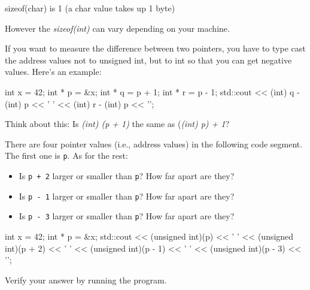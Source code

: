sizeof(char) is 1 (a char value takes up 1 byte)

However the \textit{sizeof(int)} can vary depending on your machine.

If you want to measure the difference between two pointers, you have to
type cast the address values not to unsigned int, but to int so that you
can get negative values. Here's an example:

\begin{consolethree}[escapeinside=||]
int x = 42;
int * p = &x;
int * q = p + 1;
int * r = p - 1;
std::cout << (int) q - (int) p << ' '
          << (int) r - (int) p << '\n';
\end{consolethree}

\begin{ex}
Think about this: Is \textit{(int) (p + 1)} the same as
(\textit{(int) p) + 1}?
\end{ex}

\begin{ex}
There are four pointer values (i.e., address values)
in the following code segment. The first one is \texttt{p}. As for the
rest:

\begin{itemize}
\item Is \texttt{p + 2} larger or smaller than \texttt{p}? How far apart are
  they?
\item Is \texttt{p - 1} larger or smaller than \texttt{p}? How far apart are
  they?
\item Is \texttt{p - 3} larger or smaller than \texttt{p}? How far apart are
  they?
\end{itemize}

\begin{consolethree}[escapeinside=||]
int x = 42;
int * p = &x;
std::cout << (unsigned int)(p) << ' '
          << (unsigned int)(p + 2) << ' '
          << (unsigned int)(p - 1) << ' '
          << (unsigned int)(p - 3) << '\n';
\end{consolethree}

Verify your answer by running the program.
\end{ex}

